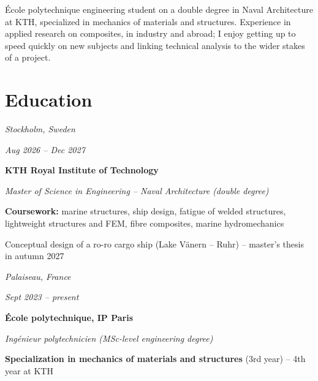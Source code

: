 \documentclass[10pt]{article}
\begin{document}

\begin{center}
    \small
    École polytechnique engineering student on a double degree in Naval Architecture at KTH, specialized in mechanics of materials and structures. Experience in applied research on composites, in industry and abroad; I enjoy getting up to speed quickly on new subjects and linking technical analysis to the wider stakes of a project.
\end{center}


\section{Education}

    \begin{twocolentry}{
    \textit{Stockholm, Sweden}

    \textit{Aug 2026 – Dec 2027}}
        \textbf{KTH Royal Institute of Technology}

        \textit{Master of Science in Engineering -- Naval Architecture (double degree)}
    \end{twocolentry}

    \bulletsep
    \begin{onecolentry}
        \begin{highlights}
            \item \textbf{Coursework:} marine structures, ship design, fatigue of welded structures, lightweight structures and FEM, fibre composites, marine hydromechanics
            \item Conceptual design of a ro-ro cargo ship (Lake Vänern -- Ruhr) -- master's thesis in autumn 2027
        \end{highlights}
    \end{onecolentry}

    \entrysep

    \begin{twocolentry}{
    \textit{Palaiseau, France}

    \textit{Sept 2023 – present}}
        \textbf{École polytechnique, IP Paris}

        \textit{Ingénieur polytechnicien (MSc-level engineering degree)}
    \end{twocolentry}

    \bulletsep
    \begin{onecolentry}
        \begin{highlights}
            \item \textbf{Specialization in mechanics of materials and structures} (3rd year) -- 4th year at KTH
        \end{highlights}
    \end{onecolentry}
\end{document}
